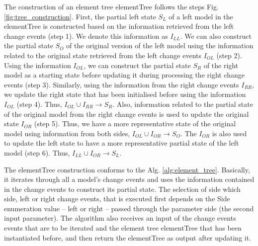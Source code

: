 \documentclass{llncs}
\begin{document}
\vspace{-20pt}
The construction of an element tree \textsf{elementTree} follows the steps Fig. \ref{fig:tree_construction}. First, the partial left state $S_{L}$ of a left model in the \textsf{elementTree} is constructed based on the information retrieved from the left change events (step 1). We denote this information as $I_{LL}$. We can also construct the partial state $S_{O}$ of the original version of the left model using the information related to the original state retrieved from the left change events $I_{OL}$ (step 2). Using the information $I_{OL}$, we can construct the partial state $S_{R}$ of the right model as a starting state before updating it during processing the right change events (step 3). Similarly, using the information from the right change events $I_{RR}$, we update the right state that has been initialised before using the information $I_{OL}$ (step 4). Thus,  $I_{OL} \cup I_{RR} \rightarrow S_{R}$. Also, information related to the partial state of the original model from the right change events is used to update the original state $I_{OR}$ (step 5). Thus, we have a more representative state of the original model using information from both sides, $I_{OL} \cup I_{OR} \rightarrow S_{O}$. The $I_{OR}$ is also used to update the left state to have a more representative partial state of the left model (step 6). Thus,  $I_{LL} \cup I_{OR} \rightarrow S_{L}$.   

\vspace{-10pt}
The \textsf{elementTree} construction conforms to the Alg. \ref{alg:element_tree}. Basically, it iterates through all a model's change events and uses the information contained in the change events to construct its partial state. The selection of side which side, left or right change events, that is executed first depends on the \textsf{Side} enumeration value -- \textsf{left} or \textsf{right} -- passed through the parameter \textsf{side} (the second input parameter). The algorithm also receives an input of the change events \textsf{events} that are to be iterated and the element tree \textsf{elementTree} that has been instantiated before, and then return the \textsf{elementTree} as output after updating it.
\end{document}

